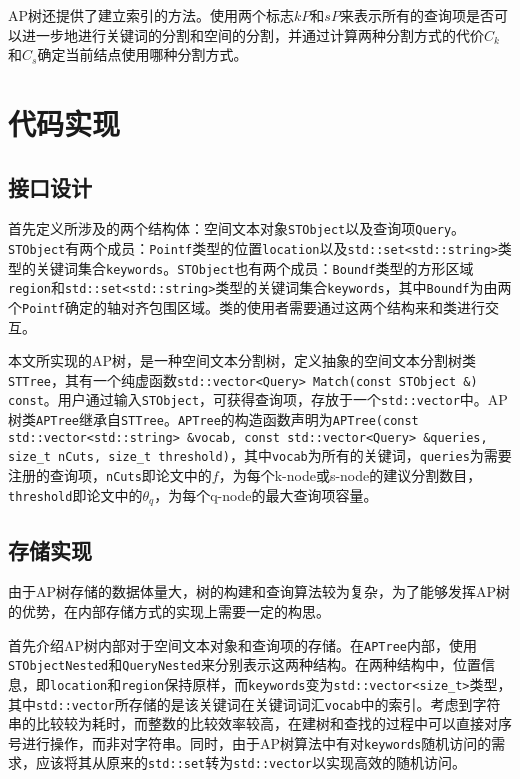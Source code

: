 \documentclass[UTF8]{ctexart}
\begin{document}
AP树还提供了建立索引的方法。使用两个标志$kP$和$sP$来表示所有的查询项是否可以进一步地进行关键词的分割和空间的分割，并通过计算两种分割方式的代价$C_k$和$C_s$确定当前结点使用哪种分割方式。


\section{代码实现}

\subsection{接口设计}
首先定义所涉及的两个结构体：空间文本对象\texttt{STObject}以及查询项\texttt{Query}。\texttt{STObject}有两个成员：\texttt{Pointf}类型的位置\texttt{location}以及\texttt{std::set<std::string>}类型的关键词集合\texttt{keywords}。\texttt{STObject}也有两个成员：\texttt{Boundf}类型的方形区域\texttt{region}和\texttt{std::set<std::string>}类型的关键词集合\texttt{keywords}，其中\texttt{Boundf}为由两个\texttt{Pointf}确定的轴对齐包围区域。类的使用者需要通过这两个结构来和类进行交互。

本文所实现的AP树，是一种空间文本分割树，定义抽象的空间文本分割树类\texttt{STTree}，其有一个纯虚函数\texttt{std::vector<Query> Match(const STObject \&) const}。用户通过输入\texttt{STObject}，可获得查询项，存放于一个\texttt{std::vector}中。AP树类\texttt{APTree}继承自\texttt{STTree}。\texttt{APTree}的构造函数声明为\texttt{APTree(const std::vector<std::string> \&vocab, const std::vector<Query> \&queries, size\_t nCuts, size\_t threshold)}，其中\texttt{vocab}为所有的关键词，\texttt{queries}为需要注册的查询项，\texttt{nCuts}即论文中的$f$，为每个k-node或s-node的建议分割数目，\texttt{threshold}即论文中的$\theta_q$，为每个q-node的最大查询项容量。

\subsection{存储实现}
由于AP树存储的数据体量大，树的构建和查询算法较为复杂，为了能够发挥AP树的优势，在内部存储方式的实现上需要一定的构思。

首先介绍AP树内部对于空间文本对象和查询项的存储。在\texttt{APTree}内部，使用\texttt{STObjectNested}和\texttt{QueryNested}来分别表示这两种结构。在两种结构中，位置信息，即\texttt{location}和\texttt{region}保持原样，而\texttt{keywords}变为\texttt{std::vector<size\_t>}类型，其中\texttt{std::vector}所存储的是该关键词在关键词词汇\texttt{vocab}中的索引。考虑到字符串的比较较为耗时，而整数的比较效率较高，在建树和查找的过程中可以直接对序号进行操作，而非对字符串。同时，由于AP树算法中有对\texttt{keywords}随机访问的需求，应该将其从原来的\texttt{std::set}转为\texttt{std::vector}以实现高效的随机访问。
\end{document}
